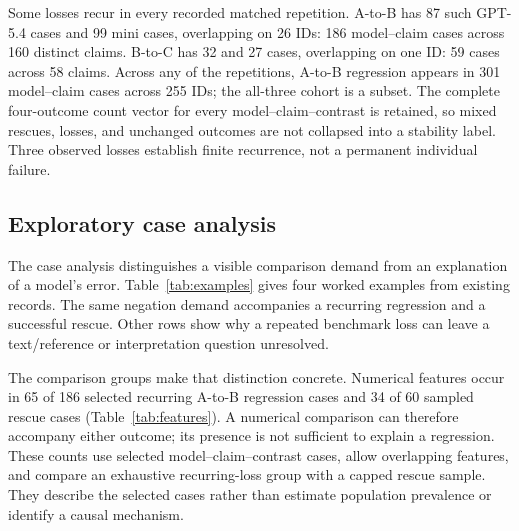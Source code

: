 \documentclass[11pt,letterpaper]{article}
\begin{document}
Some losses recur in every recorded matched repetition. A-to-B has 87 such GPT-5.4 cases and 99 mini cases, overlapping on 26 IDs: 186 model--claim cases across 160 distinct claims. B-to-C has 32 and 27 cases, overlapping on one ID: 59 cases across 58 claims. Across any of the repetitions, A-to-B regression appears in 301 model--claim cases across 255 IDs; the all-three cohort is a subset. The complete four-outcome count vector for every model--claim--contrast is retained, so mixed rescues, losses, and unchanged outcomes are not collapsed into a stability label. Three observed losses establish finite recurrence, not a permanent individual failure.

\subsection{Exploratory case analysis}\label{sec:cases}
The case analysis distinguishes a visible comparison demand from an explanation of a model's error. Table~\ref{tab:examples} gives four worked examples from existing records. The same negation demand accompanies a recurring regression and a successful rescue. Other rows show why a repeated benchmark loss can leave a text/reference or interpretation question unresolved.

The comparison groups make that distinction concrete. Numerical features occur in 65 of 186 selected recurring A-to-B regression cases and 34 of 60 sampled rescue cases (Table~\ref{tab:features}). A numerical comparison can therefore accompany either outcome; its presence is not sufficient to explain a regression. These counts use selected model--claim--contrast cases, allow overlapping features, and compare an exhaustive recurring-loss group with a capped rescue sample. They describe the selected cases rather than estimate population prevalence or identify a causal mechanism.
\end{document}
